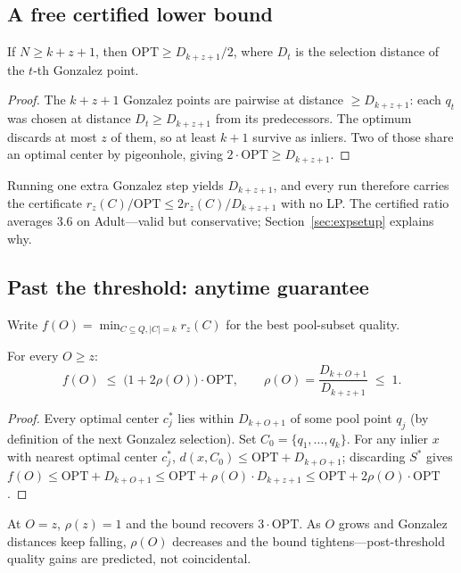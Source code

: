 \documentclass[twoside,leqno,twocolumn]{article}
\newcommand{\OPT}{\mathrm{OPT}}
\newcommand{\rz}{r_z}
\begin{document}
\subsection{A free certified lower bound}

\begin{lemma}
\label{lem:cert}
If $N\ge k{+}z{+}1$, then $\OPT\ge D_{k+z+1}/2$, where $D_t$ is the
selection distance of the $t$-th Gonzalez point.
\end{lemma}
\begin{proof}
The $k+z+1$ Gonzalez points are pairwise at distance $\ge D_{k+z+1}$:
each $q_t$ was chosen at distance $D_t\ge D_{k+z+1}$ from its
predecessors. The optimum discards at most $z$ of them, so at least
$k+1$ survive as inliers. Two of those share an optimal center by
pigeonhole, giving $2\cdot\OPT\ge D_{k+z+1}$.
\end{proof}

Running one extra Gonzalez step yields $D_{k+z+1}$, and every run
therefore carries the certificate $\rz(C)/\OPT\le2\rz(C)/D_{k+z+1}$
with no LP. The certified ratio averages $3.6$ on Adult---valid but
conservative; Section~\ref{sec:expsetup} explains why.

\subsection{Past the threshold: anytime guarantee}
\label{sec:anytime}

Write $f(O)=\min_{C\subseteq Q,|C|=k}\rz(C)$ for the best pool-subset
quality.

\begin{theorem}
\label{thm:anytime}
For every $O\ge z$:
\[
  f(O)\;\le\;\bigl(1+2\rho(O)\bigr)\cdot\OPT,
  \qquad\rho(O)=\frac{D_{k+O+1}}{D_{k+z+1}}\;\le\;1.
\]
\end{theorem}
\begin{proof}
Every optimal center $c^*_j$ lies within $D_{k+O+1}$ of some pool
point $q_j$ (by definition of the next Gonzalez selection). Set
$C_0=\{q_1,\dots,q_k\}$. For any inlier $x$ with nearest optimal
center $c^*_j$, $d(x,C_0)\le\OPT+D_{k+O+1}$; discarding $S^*$ gives
$f(O)\le\OPT+D_{k+O+1}\le\OPT+\rho(O)\cdot D_{k+z+1}\le
\OPT+2\rho(O)\cdot\OPT$.
\end{proof}

At $O=z$, $\rho(z)=1$ and the bound recovers $3\cdot\OPT$. As $O$
grows and Gonzalez distances keep falling, $\rho(O)$ decreases and
the bound tightens---post-threshold quality gains are predicted, not
coincidental.
\end{document}

